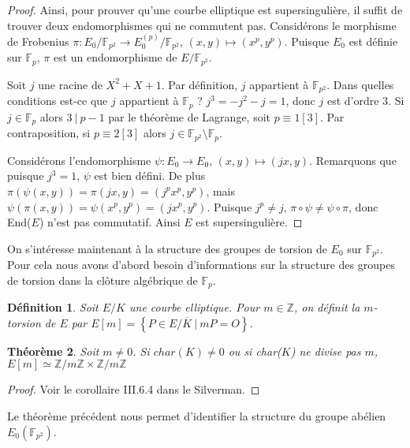 \documentclass{article}
\theoremstyle{plain}%
\newtheorem{thm}{Théorème}[section]
\newtheorem{deff}[thm]{Définition}
\theoremstyle{definition}%
\newcommand{\F}{\mathbb{F}}
\newcommand{\Z}{\mathbb{Z}}
\begin{document}
\begin{proof}
Ainsi, pour prouver qu'une courbe elliptique est supersingulière, il suffit de trouver deux endomorphismes qui ne commutent pas.
Considérons le morphisme de Frobenius $\pi : E_0/\F_{p^2} \to E_0^{(p)}/\F_{p^2}$, $(x, y) \mapsto (x^p, y^p)$. 
Puisque $E_0$ est définie sur $\F_{p}$, $\pi$ est un endomorphisme de $E/\F_{p^2}$.

Soit $j$ une racine de $X^2 + X + 1$. 
Par définition, $j$ appartient à $\F_{p^2}$. 
Dans quelles conditions est-ce que $j$ appartient à $\F_{p}$ ? 
$j^3 = -j^2 -j = 1$, donc $j$ est d'ordre $3$. 
Si $j\in \F_{p}$ alors $3\ |\ p-1$ par le théorème de Lagrange, soit $p\equiv 1[3]$. 
Par contraposition, si $p \equiv 2 [3]$ alors $j\in\F_{p^2}\setminus\F_{p}$.

Considérons l'endomorphisme $\psi : E_0 \to E_0$, $(x, y) \mapsto (jx, y)$. 
Remarquons que puisque $j^3 = 1$, $\psi$ est bien défini.
De plus $\pi(\psi(x, y)) = \pi(jx, y) = (j^px^p, y^p)$, mais $\psi(\pi(x, y)) = \psi(x^p, y^p) = (jx^p, y^p)$. 
Puisque $j^p\neq j$, $\pi \circ \psi \neq \psi \circ \pi$, donc End($E$) n'est pas commutatif.
Ainsi $E$ est supersingulière.
\end{proof}

On s'intéresse maintenant à la structure des groupes de torsion de $E_0$ sur $\F_{p^2}$. Pour cela nous avons d'abord besoin d'informations sur la structure des groupes de torsion dans la clôture algébrique de $\F_{p}$.
\begin{deff}
  Soit $E/K$ une courbe elliptique. Pour $m\in\Z$, on définit la $m$-torsion de $E$ par $ E[m] = \left\{ P\in E/\overline{K} \ \vert\  mP = O \right\}$.
\end{deff}

\begin{thm}
  Soit $m\neq0$. Si $char(K)\neq 0$ ou si char($K$) ne divise pas $m$, $E[m] \simeq {\Z}/{m\Z} \times  {\Z}/{m\Z}$
\end{thm}

\begin{proof}
  Voir le corollaire III.6.4 dans le Silverman.
\end{proof}

Le théorème précédent nous permet d'identifier la structure du groupe abélien $E_0(\F_{p^2})$.
\end{document}
